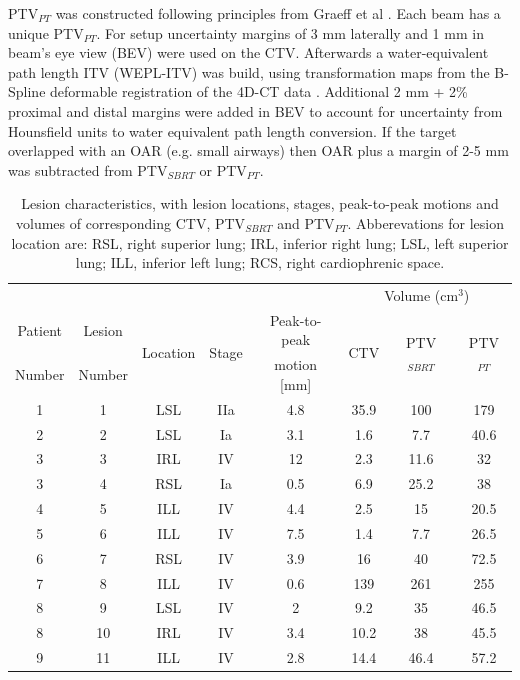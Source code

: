 PTV$_{PT}$ was constructed following principles from Graeff et al \cite{Graeff2012}. Each beam has a unique PTV$_{PT}$. For setup uncertainty margins of 3 mm laterally and 1 mm in beam’s eye view (BEV) were used on the CTV. Afterwards a water-equivalent path length ITV (WEPL-ITV) was build, using transformation maps from the B-Spline deformable registration of the 4D-CT data \cite{Shackleford2010}. Additional 2 mm + 2\% proximal and distal margins were added in BEV to account for uncertainty from Hounsfield units to water equivalent path length conversion.
If the target overlapped with an OAR (e.g. small airways) then OAR plus a margin of 2-5 mm was subtracted from PTV$_{SBRT}$ or PTV$_{PT}$.

\newpage
\begin{table}[H]
  \centering
  \caption{Lesion characteristics, with lesion locations, stages, peak-to-peak motions and volumes of corresponding CTV, PTV$_{SBRT}$ and PTV$_{PT}$. Abberevations for lesion location are: 
  RSL, right superior lung; IRL, inferior right lung; LSL, left superior lung; ILL, inferior left lung; RCS, right cardiophrenic space.}
  \begin{tabular}{|c|c|c|c|c|c|c|c|}
    \hline\hline
     & & & & & \multicolumn{3}{|c|}{Volume (cm$^3$)} \\ \cline{6-8}
    Patient & Lesion & \multirow{2}{*}{Location} & \multirow{2}{*}{Stage} &
    Peak-to-peak & \multirow{2}{*}{CTV} & \multirow{2}{*}{PTV$_{SBRT}$} & \multirow{2}{*}{PTV$_{PT}$}\\
    Number & Number &  & & motion [mm] & & & \\
    \hline
    1 & 1 & LSL & IIa & 4.8 & 35.9 & 100 & 179 \\
    2 & 2 & LSL & Ia & 3.1 & 1.6 & 7.7 & 40.6 \\
    3 & 3 & IRL & IV & 12 & 2.3 & 11.6 & 32 \\
    3 & 4 & RSL & Ia & 0.5 & 6.9 & 25.2 & 38 \\
    4 & 5 & ILL & IV & 4.4 & 2.5 & 15 & 20.5 \\
    5 & 6 & ILL & IV & 7.5 & 1.4 & 7.7 & 26.5 \\
    6 & 7 & RSL & IV & 3.9 & 16 & 40 & 72.5 \\
    7 & 8 & ILL & IV & 0.6 & 139 & 261 & 255 \\
    8 & 9 & LSL & IV & 2 & 9.2 & 35 & 46.5 \\
    8 & 10 & IRL & IV & 3.4 & 10.2 & 38 & 45.5 \\
    9 & 11 & ILL & IV & 2.8 & 14.4 & 46.4 & 57.2 \\

\end{tabular}
\end{table}
